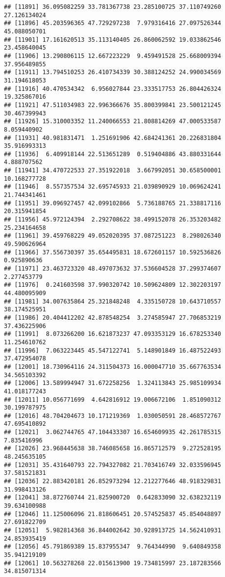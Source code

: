 \documentclass[
]{article}
\begin{document}
\begin{verbatim}
## [11891] 36.095082259 33.781367738 23.285100725 37.110749260 27.126134024
## [11896] 45.203596365 47.729297238  7.979316416 27.097526344 45.088050701
## [11901] 17.161620513 35.113140405 26.860062592 19.033862546 23.458640045
## [11906] 13.290806115 12.667223229  9.459491528 25.668009394 37.956489855
## [11911] 13.794510253 26.410734339 30.388124252 24.990034569 31.194618053
## [11916] 40.470534342  6.956027844 23.333517753 26.804426324 19.325867016
## [11921] 47.511034983 22.996366676 35.800399841 23.500121245 30.467399943
## [11926] 15.310003352 11.240066553 21.808814269 47.000533587  8.059440902
## [11931] 40.981831471  1.251691906 42.684241361 20.226831804 35.916993313
## [11936]  6.409918144 22.513651289  0.519404886 43.880331644  4.888707562
## [11941] 34.470722533 27.351922018  3.667992051 30.658500001 10.168277728
## [11946]  8.557357534 32.695745933 21.039890929 10.069624241 21.744341461
## [11951] 39.096927457 42.099102866  5.736188765 21.338817116 20.315941854
## [11956] 45.972124394  2.292708622 38.499152078 26.353203482 25.234164658
## [11961] 39.459768229 49.052020395 37.087251223  8.298026340 49.590626964
## [11966] 37.556730397 35.654495831 18.672601157 10.592536826  0.925890636
## [11971] 23.463723320 48.497073632 37.536604528 37.299374607  2.277453779
## [11976]  0.241603598 37.990320742 10.509624809 12.302203197 44.480095909
## [11981] 34.007635864 25.321848248  4.335150728 10.643710557 38.174525951
## [11986] 20.404412202 42.878548254  3.274585947 27.706853219 37.436225906
## [11991]  8.073266200 16.621873237 47.093353129 16.678253340 11.254610762
## [11996]  7.063223445 45.547122741  5.148901849 16.487522493 37.472954078
## [12001] 18.730964116 24.311504373 16.000047710 35.667763534 34.565103392
## [12006] 13.589994947 31.672258256  1.324113843 25.985109934 41.018177243
## [12011] 10.056771699  4.642816912 19.006672106  1.851090312 30.199787975
## [12016] 48.704204673 10.171219369  1.030050591 28.468572767 47.695410892
## [12021]  3.062744765 47.104433307 16.654609935 42.261785315  7.835416996
## [12026] 23.968445638 38.746085658 16.865712579  9.272528195 48.245635105
## [12031] 35.431640793 22.794327082 21.703416749 32.033596945 37.581521831
## [12036] 22.883420181 26.852973294 12.212277646 48.918329831 31.998413126
## [12041] 38.872760744 21.825900720  0.642833090 32.638232119 39.634100988
## [12046] 11.125006096 21.818606451 20.574525837 45.854048897 27.691822709
## [12051]  5.982814368 36.844002642 30.928913725 14.562410931 24.853935419
## [12056] 45.791869389 15.837955347  9.764344990  9.640849358 35.941219109
## [12061] 10.563278268 22.015613900 19.734815997 23.187283566 34.815071314

\end{verbatim}
\end{document}
